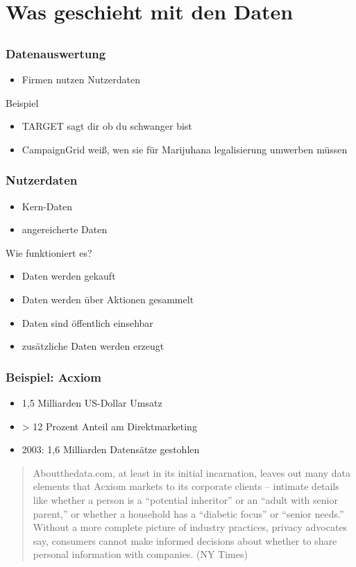 \documentclass[12pt]{beamer}
\begin{document}
\section{Was geschieht mit den Daten}
\subsection{}
\begin{frame}
	\frametitle{Datenauswertung}
	\begin{itemize}
		\item Firmen nutzen Nutzerdaten
	\end{itemize}
	Beispiel
	\begin{itemize}
		\item TARGET sagt dir ob du schwanger bist
		\item CampaignGrid weiß, wen sie für Marijuhana legalisierung umwerben müssen
	\end{itemize}
\end{frame}

\begin{frame}
	\frametitle{Nutzerdaten}
	\begin{itemize}
		\item Kern-Daten
		\item angereicherte Daten
	\end{itemize}
	Wie funktioniert es?
	\begin{itemize}
		\item Daten werden gekauft
		\item Daten werden über Aktionen gesammelt
		\item Daten sind öffentlich einsehbar
		\item zusätzliche Daten werden erzeugt
	\end{itemize}
\end{frame}

\begin{frame}
	\frametitle{Beispiel: Acxiom}
	\begin{itemize}
		\item 1,5 Milliarden US-Dollar Umsatz
		\item > 12 Prozent Anteil am Direktmarketing
		\item 2003: 1,6 Milliarden Datensätze gestohlen
	\end{itemize}
	\begin{quote} 
		Aboutthedata.com, at least in its initial incarnation, leaves out many data elements that Acxiom markets to its corporate clients -- intimate details like whether a person is a "`potential inheritor"' or an "`adult with senior parent,"' or whether a household has a "`diabetic focus"' or "`senior needs."' Without a more complete picture of industry practices, privacy advocates say, consumers cannot make informed decisions about whether to share personal information with companies. (NY Times)
	\end{quote}
\end{frame}
\end{document}
